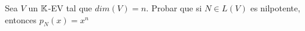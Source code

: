 \item Sea $V$ un $\mathbb{K}$-EV tal que $dim(V)=n$. Probar que si $N\in L(V)$ es nilpotente, entonces $p_N(x)=x^n$
    \begin{mdframed}[style=s]
        
    \end{mdframed}
